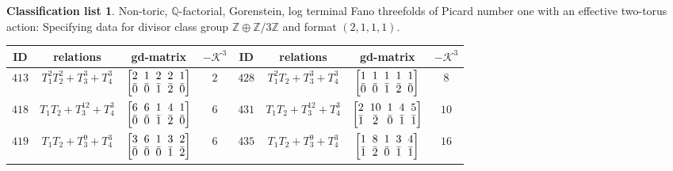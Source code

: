 \documentclass[10pt,a4paper]{amsart}
\theoremstyle{definition}
\newtheorem{class-list}[thm]{Classification list}
\def\ZZ{{\mathbb Z}}
\def\QQ{{\mathbb Q}}
\numberwithin{equation}{section}
\begin{document}
\begin{class-list}
Non-toric, $\QQ$-factorial, Gorenstein, log terminal Fano
threefolds of Picard number one with an effective two-torus action:
Specifying data for divisor class group $\ZZ\oplus \ZZ/3\ZZ$ and
format $(2,1,1,1)$.
\begin{table}[h!]\centering\setlength{\tabcolsep}{3.5pt}
\renewcommand{\arraystretch}{1.35}\small\tabulinesep=1mm
\begin{tabu}{c|c|c|c||c|c|c|c}
\hline
ID&relations&gd-matrix&$-\mathcal{K}^3$&ID&relations&gd-matrix&$-\mathcal{K}^3$
\\
\hline
${413}$&${T_{1}^{2}T_{2}^{2}+T_{3}^{3}+T_{4}^{3}}$
&$\arraycolsep=1mm\begin{bmatrix}{2} & {1} & {2} & {2} & {1} \\ {\bar{0}} & {\bar{0}} & {\bar{1}} & {\bar{2}} & {\bar{0}}\end{bmatrix}$&${2}$
&${428}$&${T_{1}^{2}T_{2}+T_{3}^{3}+T_{4}^{3}}$
&$\arraycolsep=1mm\begin{bmatrix}{1} & {1} & {1} & {1} & {1} \\ {\bar{0}} & {\bar{0}} & {\bar{1}} & {\bar{2}} & {\bar{0}}\end{bmatrix}$&${8}$
\\
\hline
${418}$&${T_{1}T_{2}+T_{3}^{12}+T_{4}^{3}}$
&$\arraycolsep=1mm\begin{bmatrix}{6} & {6} & {1} & {4} & {1} \\ {\bar{0}} & {\bar{0}} & {\bar{1}} & {\bar{2}} & {\bar{0}}\end{bmatrix}$&${6}$
&${431}$&${T_{1}T_{2}+T_{3}^{12}+T_{4}^{3}}$
&$\arraycolsep=1mm\begin{bmatrix}{2} & {10} & {1} & {4} & {5} \\ {\bar{1}} & {\bar{2}} & {\bar{0}} & {\bar{1}} & {\bar{1}}\end{bmatrix}$&${10}$
\\
\hline
${419}$&${T_{1}T_{2}+T_{3}^{9}+T_{4}^{3}}$
&$\arraycolsep=1mm\begin{bmatrix}{3} & {6} & {1} & {3} & {2} \\ {\bar{0}} & {\bar{0}} & {\bar{0}} & {\bar{1}} & {\bar{2}}\end{bmatrix}$&${6}$
&${435}$&${T_{1}T_{2}+T_{3}^{9}+T_{4}^{3}}$
&$\arraycolsep=1mm\begin{bmatrix}{1} & {8} & {1} & {3} & {4} \\ {\bar{1}} & {\bar{2}} & {\bar{0}} & {\bar{1}} & {\bar{1}}\end{bmatrix}$&${16}$
\\

\end{tabu}
\end{table}
\end{class-list}
\end{document}
